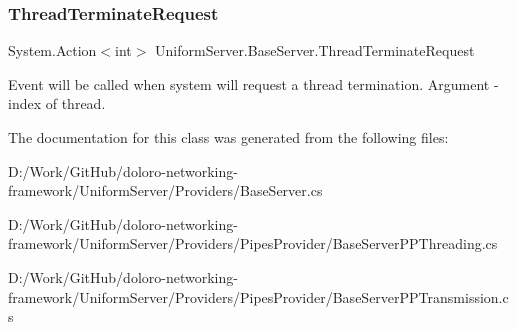 \mbox{\label{class_uniform_server_1_1_base_server_a889c3aaa1cca7f4a9a4e32617516f4be}} 
\subsubsection{\texorpdfstring{Thread\+Terminate\+Request}{ThreadTerminateRequest}}
{\footnotesize\ttfamily System.\+Action$<$int$>$ Uniform\+Server.\+Base\+Server.\+Thread\+Terminate\+Request\hspace{0.3cm}{\ttfamily [static]}}



Event will be called when system will request a thread termination. Argument -\/ index of thread. 



The documentation for this class was generated from the following files\+:\begin{DoxyCompactItemize}
\item 
D\+:/\+Work/\+Git\+Hub/doloro-\/networking-\/framework/\+Uniform\+Server/\+Providers/Base\+Server.\+cs\item 
D\+:/\+Work/\+Git\+Hub/doloro-\/networking-\/framework/\+Uniform\+Server/\+Providers/\+Pipes\+Provider/Base\+Server\+P\+P\+Threading.\+cs\item 
D\+:/\+Work/\+Git\+Hub/doloro-\/networking-\/framework/\+Uniform\+Server/\+Providers/\+Pipes\+Provider/Base\+Server\+P\+P\+Transmission.\+cs\end{DoxyCompactItemize}
